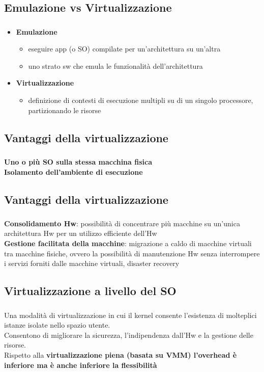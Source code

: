 \documentclass{beamer}
\newenvironment{mainframe}{
	\begin{frame}
		\frametitle{\insertsubsection}
		\framesubtitle{\insertsection}
	}{
	\end{frame}
}
\begin{document}
\subsection{Emulazione vs Virtualizzazione}
\begin{mainframe}
	\begin{itemize}
		\item \textbf{Emulazione}
		\begin{itemize}
			\item eseguire app (o SO) compilate per un'architettura su un'altra
			\item uno strato sw che emula le funzionalità dell'architettura
		\end{itemize}
		\item \textbf{Virtualizzazione}
		\begin{itemize}
			\item definizione di contesti di esecuzione multipli su di un singolo processore, partizionando le risorse
		\end{itemize}
	\end{itemize}
\end{mainframe}
\subsection{Vantaggi della virtualizzazione}
\begin{mainframe}
	\textbf{Uno o più SO sulla stessa macchina fisica}\\
	\textbf{Isolamento dell'ambiente di esecuzione}
\end{mainframe}
\subsection{Vantaggi della virtualizzazione}
\begin{mainframe}
	\textbf{Consolidamento Hw}: possibilità di concentrare più macchine su un'unica architettura Hw per un utilizzo efficiente dell'Hw\\
	\textbf{Gestione facilitata della macchine}: migrazione a caldo di macchine virtuali tra macchine fisiche, ovvero la possibilità di manutenzione Hw senza interrompere i servizi forniti dalle macchine virtuali, disaster recovery
\end{mainframe}
\subsection{Virtualizzazione a livello del SO}
\begin{mainframe}
	Una modalità di virtualizzazione in cui il kernel consente l'esistenza di molteplici istanze isolate nello spazio utente.\\
	Consentono di migliorare la sicurezza, l'indipendenza dall'Hw e la gestione delle risorse.\\
	Rispetto alla \textbf{virtualizzazione piena (basata su VMM) l'overhead è inferiore ma è anche inferiore la flessibilità}
\end{mainframe}
\end{document}
